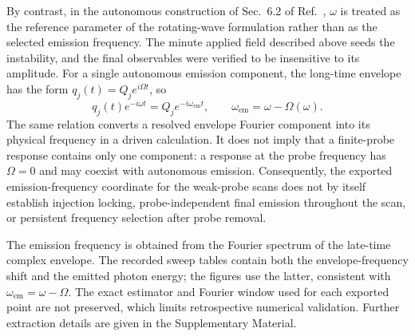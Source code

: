 \documentclass{optica-article}
\begin{document}
By contrast, in the autonomous construction of Sec.~6.2 of Ref.~\cite{Aradian:2024}, $\omega$ is treated as the reference parameter of the rotating-wave formulation rather than as the selected emission frequency. The minute applied field described above seeds the instability, and the final observables were verified to be insensitive to its amplitude. For a single autonomous emission component, the long-time envelope has the form $q_j(t)=Q_j e^{i\Omega t}$, so
\begin{equation}
q_j(t)e^{-i\omega t}=Q_j e^{-i\omega_{\mathrm{em}}t},
\qquad \omega_{\mathrm{em}}=\omega-\Omega(\omega).
\label{eq:frequency_pulling}
\end{equation}
The same relation converts a resolved envelope Fourier component into its physical frequency in a driven calculation. It does not imply that a finite-probe response contains only one component: a response at the probe frequency has $\Omega=0$ and may coexist with autonomous emission. Consequently, the exported emission-frequency coordinate for the weak-probe scans does not by itself establish injection locking, probe-independent final emission throughout the scan, or persistent frequency selection after probe removal.


The emission frequency is obtained from the Fourier spectrum of the late-time complex envelope. The recorded sweep tables contain both the envelope-frequency shift and the emitted photon energy; the figures use the latter, consistent with $\omega_{\mathrm{em}}=\omega-\Omega$. The exact estimator and Fourier window used for each exported point are not preserved, which limits retrospective numerical validation. Further extraction details are given in the Supplementary Material.
\end{document}
